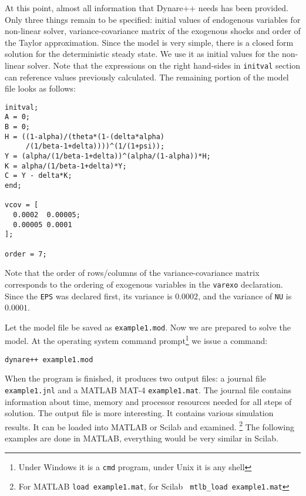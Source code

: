 \documentclass[10pt]{article}
\begin{document}
At this point, almost all information that Dynare++ needs has been
provided. Only three things remain to be specified: initial values of
endogenous variables for non-linear solver, variance-covariance matrix
of the exogenous shocks and order of the Taylor approximation. Since
the model is very simple, there is a closed form solution for the
deterministic steady state. We use it as initial values for the
non-linear solver. Note that the expressions on the right hand-sides in
{\tt initval} section can reference values previously calculated. The
remaining portion of the model file looks as follows:

{\small
\begin{verbatim}
initval;
A = 0;
B = 0;
H = ((1-alpha)/(theta*(1-(delta*alpha)
     /(1/beta-1+delta))))^(1/(1+psi));
Y = (alpha/(1/beta-1+delta))^(alpha/(1-alpha))*H;
K = alpha/(1/beta-1+delta)*Y;
C = Y - delta*K;
end;

vcov = [
  0.0002  0.00005;
  0.00005 0.0001
];

order = 7;
\end{verbatim}
}

Note that the order of rows/columns of the variance-covariance matrix
corresponds to the ordering of exogenous variables in the {\tt varexo}
declaration. Since the {\tt EPS} was declared first, its variance is
$0.0002$, and the variance of {\tt NU} is $0.0001$.

Let the model file be saved as {\tt example1.mod}. Now we are prepared
to solve the model. At the operating system command
prompt\footnote{Under Windows it is a {\tt cmd} program, under Unix it
is any shell} we issue a command:

{\small
\begin{verbatim}
dynare++ example1.mod
\end{verbatim}
}

When the program is finished, it produces two output files: a journal
file {\tt example1.jnl} and a MATLAB MAT-4 {\tt example1.mat}. The
journal file contains information about time, memory and processor
resources needed for all steps of solution. The output file is more
interesting. It contains various simulation results. It can be loaded
into MATLAB or Scilab and examined.%
\footnote{For MATLAB {\tt load example1.mat}, for Scilab {\tt
mtlb\_load example1.mat}} The following examples are done in MATLAB,
everything would be very similar in Scilab.
\end{document}
